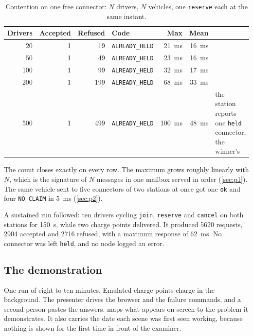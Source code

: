 \begin{table}[h]
\centering\small
\renewcommand{\arraystretch}{1.15}
\caption{Contention on one free connector: $N$ drivers, $N$ vehicles, one \texttt{reserve}
each at the same instant.}
\label{tab:load}
\begin{tabularx}{\textwidth}{@{}r r r l r r X@{}}
\toprule
Drivers & Accepted & Refused & Code & Max & Mean & \\
\midrule
20 & 1 & 19 & \texttt{ALREADY\_HELD} & 21~ms & 16~ms & \\
50 & 1 & 49 & \texttt{ALREADY\_HELD} & 23~ms & 16~ms & \\
100 & 1 & 99 & \texttt{ALREADY\_HELD} & 32~ms & 17~ms & \\
200 & 1 & 199 & \texttt{ALREADY\_HELD} & 68~ms & 33~ms & \\
500 & 1 & 499 & \texttt{ALREADY\_HELD} & 100~ms & 48~ms & the station reports one
  \texttt{held} connector, the winner's \\
\bottomrule
\end{tabularx}
\end{table}

The count closes exactly on every row. The maximum grows roughly linearly with $N$, which
is the signature of $N$ messages in one mailbox served in order (\cref{sec:p1}). The same
vehicle sent to five connectors of two stations at once got one \texttt{ok} and four
\texttt{NO\_CLAIM} in 5~ms (\cref{sec:p2}).

A sustained run followed: ten drivers cycling \texttt{join}, \texttt{reserve} and
\texttt{cancel} on both stations for 150~s, while two charge points delivered. It produced
5620 requests, 2904 accepted and 2716 refused, with a maximum response of 62~ms. No
connector was left \texttt{held}, and no node logged an error.

\subsection{The demonstration}
\label{sec:tests-demo}

One run of eight to ten minutes. Emulated charge points charge in the background. The
presenter drives the browser and the failure commands, and a second person pastes the
answers.  maps what appears on screen to the problem it
demonstrates. It also carries the date each scene was first seen working, because nothing is
shown for the first time in front of the examiner.

